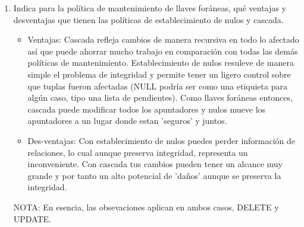 \documentclass{article}
\begin{document}
\begin{enumerate}
        \item Indica para la política de mantenimiento de llaves foráneas, qué ventajas y desventajas que tienen
        las políticas de establecimiento de nulos y cascada.
        
        \begin{itemize}
            \item Ventajas: Cascada refleja cambios de manera recursiva en todo lo afectado así que puede ahorrar
            mucho trabajo en comparación con todas las demás políticas de mantenimiento. Establecimiento de
            nulos resuleve de manera simple el problema de integridad y permite tener un ligero control sobre que 
            tuplas fueron afectadas (NULL podría ser como una etiquieta para algún caso, tipo una lista de pendientes).
            Como llaves foráneas entonces, cascada puede modificar todos los apuntadores y nulos mueve los apuntadores
            a un lugar donde estan 'seguros' y juntos.
            
            \item Des-ventajas: Con establecimiento de nulos puedes perder información de relaciones, lo cual 
            aunque preserva integridad, representa un inconveniente. Con cascada tus cambios pueden tener un 
            alcance muy grande y por tanto un alto potencial de 'daños' aunque se preserva la integridad. 
        \end{itemize}
        NOTA: En esencia, las obsevaciones aplican en ambos casos, DELETE y UPDATE.
        
   \end{enumerate}
\end{document}
